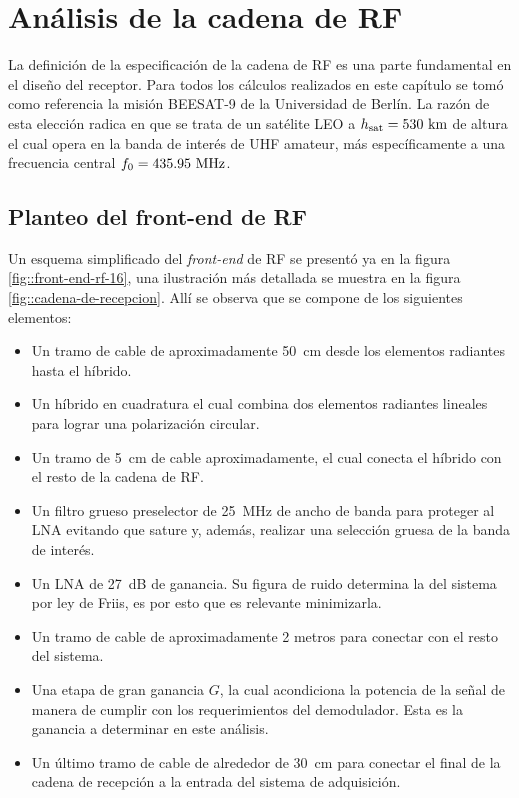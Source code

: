 \documentclass[../../main.tex]{subfiles}
\begin{document}
\graphicspath{{./figures}}
\chapter{Análisis de la cadena de RF}

La definición de la especificación de la cadena de RF es una parte fundamental en el diseño del receptor. 
Para todos los cálculos realizados en este capítulo se tomó como referencia la misión BEESAT-9 \cite{BEESAT-9} de la Universidad de Berlín. 
La razón de esta elección radica en que se trata de un satélite LEO a $h_\textrm{sat} = 530~\textrm{km}$ de altura el cual opera en la banda de interés de UHF amateur, más específicamente a una frecuencia central $f_0 = 435.95~\textrm{MHz}$.

\section{Planteo del front-end de RF}
Un esquema simplificado del \textit{front-end} de RF se presentó ya en la figura \ref{fig::front-end-rf-16}, una ilustración más detallada  se muestra en la figura \ref{fig::cadena-de-recepcion}. Allí se observa que se compone de los siguientes elementos:
\begin{itemize}
    \item Un tramo de cable de aproximadamente 50~cm desde los elementos radiantes hasta el híbrido.
    \item Un híbrido en cuadratura el cual combina dos elementos radiantes lineales para lograr una polarización circular.
    \item Un tramo de 5~cm de cable aproximadamente, el cual conecta el híbrido con el resto de la cadena de RF.
    \item Un filtro grueso preselector de 25~MHz de ancho de banda para proteger al LNA evitando que sature y, además, realizar una selección gruesa de la banda de interés.
    \item Un LNA de 27~dB de ganancia. Su figura de ruido determina la del sistema por ley de Friis, es por esto que es relevante minimizarla.
    \item Un tramo de cable de aproximadamente 2 metros para conectar con el resto del sistema.
    \item Una etapa de gran ganancia $G$, la cual acondiciona la potencia de la señal de manera de cumplir con los requerimientos del demodulador. Esta es la ganancia a determinar en este análisis.
    \item Un último tramo de cable de alrededor de 30~cm para conectar el final de la cadena de recepción a la entrada del sistema de adquisición.
\end{itemize}
\end{document}

